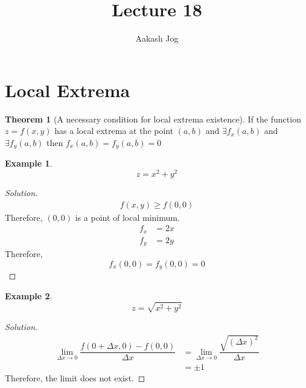 \documentclass[fleqn, a4paper, 12pt]{article}
\title{Lecture 18}
\author{Aakash Jog}
\date{\formatdate{30}{12}{2014}}
\theoremstyle{definition}
\newtheorem{example}{Example}
\theoremstyle{theorem}
\newtheorem{theorem}{Theorem}
\theoremstyle{remark}
\newenvironment{solution}
{\begin{proof}[Solution]\let\qed\relax}
	{\end{proof}}
\begin{document}
	
\maketitle

\tableofcontents

\newpage

\section{Local Extrema}

\begin{theorem}[A necessary condition for local extrema existence]
	If the function $z = f(x, y)$ has a local extrema at the point $(a, b)$ and $\exists f_x (a, b)$ and $\exists f_y (a, b)$ then $f_x (a, b) = f_y (a, b) = 0$
\end{theorem}

\begin{example}
	\begin{equation*}
		z = x^2 + y^2
	\end{equation*}
\end{example}

\begin{solution}
	\begin{align*}
		f(x, y) \geq f(0, 0)
	\end{align*}
	Therefore, $(0,0)$ is a point of local minimum.
	\begin{align*}
		f_x &= 2x\\
		f_y &= 2y
	\end{align*}
	Therefore,
	\begin{equation*}
		f_x(0,0) = f_y(0,0) = 0
	\end{equation*}
\end{solution}

\begin{example}
	\begin{equation*}
		z = \sqrt{x^2 + y^2}
	\end{equation*}
\end{example}

\begin{solution}
	\begin{align*}
		\lim\limits_{\Delta x \to 0} \dfrac{f(0 + \Delta x, 0) - f(0, 0)}{\Delta x} &= \lim\limits_{\Delta x \to 0} \dfrac{\sqrt{(\Delta x)^2}}{\Delta x}\\
		&= \pm 1
	\end{align*}
	Therefore, the limit does not exist.
\end{solution}
\end{document}
